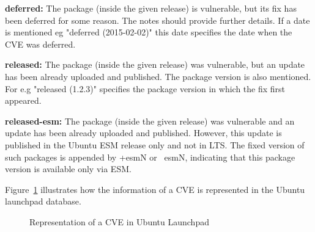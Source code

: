 \documentclass[a4paper,num-refs]{oup-contemporary}
\begin{document}
\textbf{deferred:} The package (inside the given release) is vulnerable, but 
                   its fix has been deferred for some reason. The notes
		   should provide further details. If a date is mentioned eg
		   "deferred (2015-02-02)" this date specifies the date when
		   the CVE was deferred.

\textbf{released:} The package (inside the given release) was vulnerable, but
		an update has been already uploaded and published. The package version
		is also mentioned. For e.g "released (1.2.3)"
		specifies the package version in which the fix first appeared.

\textbf{released-esm:} The package (inside the given release) was vulnerable and
		an update has been already uploaded and published. However,
		this update is published in the Ubuntu ESM release only and not in LTS.
		The fixed version of such packages is appended by
		+esmN or ~esmN, indicating that this package version is available
		only via ESM.

Figure~\ref{example} illustrates how the information of a CVE is represented
in the Ubuntu launchpad database.

\begin{figure}[H]
        \caption{\label{example} Representation of a CVE in Ubuntu Launchpad}
\end{figure}
\end{document}
